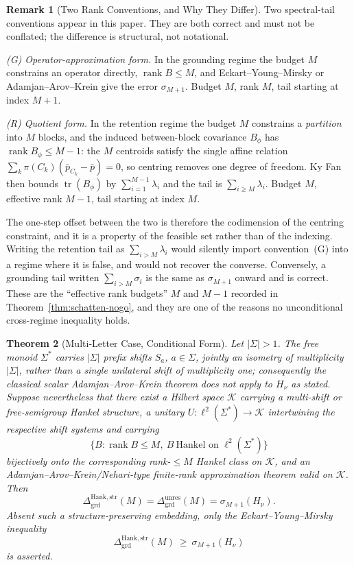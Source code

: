 \documentclass[12pt]{article}
\newtheorem{theorem}{Theorem}[section]
\theoremstyle{definition}
\newtheorem{remark}[theorem]{Remark}
\DeclareMathOperator{\rank}{rank}
\DeclareMathOperator{\tr}{tr}
\newcommand{\Dunres}{\Delta_{\mathrm{grd}}^{\mathrm{unres}}}
\newcommand{\DHankstr}{\Delta_{\mathrm{grd}}^{\mathrm{Hank,str}}}
\begin{document}
\begin{remark}[Two Rank Conventions, and Why They Differ]
\label{rem:rank-conventions}
Two spectral-tail conventions appear in this paper.  They are both correct and
must not be conflated; the difference is structural, not notational.

\emph{(G) Operator-approximation form.}  In the grounding regime the budget $M$
constrains an operator directly, $\rank B\le M$, and Eckart--Young--Mirsky or
Adamjan--Arov--Krein give the error $\sigma_{M+1}$.  Budget $M$, rank $M$,
tail starting at index $M+1$.

\emph{(R) Quotient form.}  In the retention regime the budget $M$ constrains a
\emph{partition} into $M$ blocks, and the induced between-block covariance
$B_\phi$ has $\rank B_\phi\le M-1$: the $M$ centroids satisfy the single affine
relation $\sum_k\pi(C_k)(\bar p_{C_k}-\bar p)=0$, so centring removes one
degree of freedom.  Ky Fan then bounds $\tr(B_\phi)$ by
$\sum_{i=1}^{M-1}\lambda_i$ and the tail is $\sum_{i\ge M}\lambda_i$.  Budget
$M$, effective rank $M-1$, tail starting at index $M$.

The one-step offset between the two is therefore the codimension of the
centring constraint, and it is a property of the feasible set rather than of
the indexing.  Writing the retention tail as $\sum_{i>M}\lambda_i$ would
silently import convention~(G) into a regime where it is false, and would not
recover the converse.  Conversely, a grounding tail written $\sum_{i>M}
\sigma_i$ is the same as $\sigma_{M+1}$ onward and is correct.  These are the
``effective rank budgets'' $M$ and $M-1$ recorded in
Theorem~\ref{thm:schatten-nogo}, and they are one of the reasons no
unconditional cross-regime inequality holds.
\end{remark}

\begin{theorem}[Multi-Letter Case, Conditional Form]
\label{thm:aak-multiletter}
Let $|\Sigma|>1$.  The free monoid $\Sigma^*$ carries $|\Sigma|$ prefix
shifts $S_a$, $a\in\Sigma$, jointly an isometry of multiplicity $|\Sigma|$,
rather than a single unilateral shift of multiplicity one; consequently the
classical scalar Adamjan--Arov--Krein theorem does not apply to $H_\nu$ as
stated.  Suppose nevertheless that there exist a Hilbert space $\mathcal K$
carrying a multi-shift or free-semigroup Hankel structure, a unitary
$U:\ell^2(\Sigma^*)\to\mathcal K$ intertwining the respective shift systems and
carrying
\[
\{B:\operatorname{rank}B\le M,\ B\ \text{Hankel on }\ell^2(\Sigma^*)\}
\]
bijectively onto the corresponding rank-$\le M$ Hankel class on $\mathcal K$,
and an Adamjan--Arov--Krein/Nehari-type finite-rank approximation theorem valid
on $\mathcal K$.  Then
\[
\DHankstr(M)=\Dunres(M)=\sigma_{M+1}(H_\nu).
\]
Absent such a structure-preserving embedding, only the Eckart--Young--Mirsky
inequality
\[
\DHankstr(M)\ \ge\ \sigma_{M+1}(H_\nu)
\]
is asserted.
\end{theorem}
\end{document}

